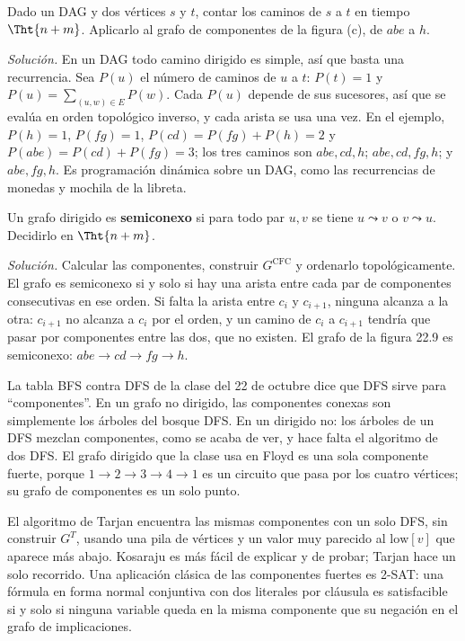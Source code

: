 \documentclass[11pt,letterpaper]{article}
\begin{document}
\begin{ejercicio}
  Dado un DAG y dos vértices $s$ y $t$, contar los caminos de $s$ a $t$
  en tiempo $\Tht{n + m}$. Aplicarlo al grafo de componentes de la
  figura (c), de $abe$ a $h$.

  \textit{Solución.} En un DAG todo camino dirigido es simple, así que
  basta una recurrencia. Sea $P(u)$ el número de caminos de $u$ a $t$:
  $P(t) = 1$ y $P(u) = \sum_{(u, w) \in E} P(w)$. Cada $P(u)$ depende
  de sus sucesores, así que se evalúa en orden topológico inverso, y
  cada arista se usa una vez. En el ejemplo, $P(h) = 1$, $P(fg) = 1$,
  $P(cd) = P(fg) + P(h) = 2$ y $P(abe) = P(cd) + P(fg) = 3$; los tres
  caminos son $abe, cd, h$; $abe, cd, fg, h$; y $abe, fg, h$. Es
  programación dinámica sobre un DAG, como las recurrencias de monedas
  y mochila de la libreta.
\end{ejercicio}

\begin{ejercicio}
  Un grafo dirigido es \textbf{semiconexo} si para todo par $u, v$ se
  tiene $u \leadsto v$ o $v \leadsto u$. Decidirlo en $\Tht{n + m}$.

  \textit{Solución.} Calcular las componentes, construir
  $G^{\text{CFC}}$ y ordenarlo topológicamente. El grafo es semiconexo
  si y solo si hay una arista entre cada par de componentes
  consecutivas en ese orden. Si falta la arista entre $c_i$ y
  $c_{i + 1}$, ninguna alcanza a la otra: $c_{i + 1}$ no alcanza a
  $c_i$ por el orden, y un camino de $c_i$ a $c_{i + 1}$ tendría que
  pasar por componentes entre las dos, que no existen. El grafo de la
  figura 22.9 es semiconexo: $abe \to cd \to fg \to h$.
\end{ejercicio}

\begin{observacion}
  La tabla BFS contra DFS de la clase del 22 de octubre dice que DFS
  sirve para ``componentes''. En un grafo no dirigido, las componentes
  conexas son simplemente los árboles del bosque DFS. En un dirigido
  no: los árboles de un DFS mezclan componentes, como se acaba de ver,
  y hace falta el algoritmo de dos DFS. El grafo dirigido que la clase
  usa en Floyd es una sola componente fuerte, porque
  $1 \to 2 \to 3 \to 4 \to 1$ es un circuito que pasa por los cuatro
  vértices; su grafo de componentes es un solo punto.
\end{observacion}

\begin{observacion}
  El algoritmo de Tarjan encuentra las mismas componentes con un solo
  DFS, sin construir $G^T$, usando una pila de vértices y un valor muy
  parecido al $\text{low}[v]$ que aparece más abajo. Kosaraju es más
  fácil de explicar y de probar; Tarjan hace un solo recorrido. Una
  aplicación clásica de las componentes fuertes es 2-SAT: una fórmula
  en forma normal conjuntiva con dos literales por cláusula es
  satisfacible si y solo si ninguna variable queda en la misma
  componente que su negación en el grafo de implicaciones.
\end{observacion}
\end{document}
